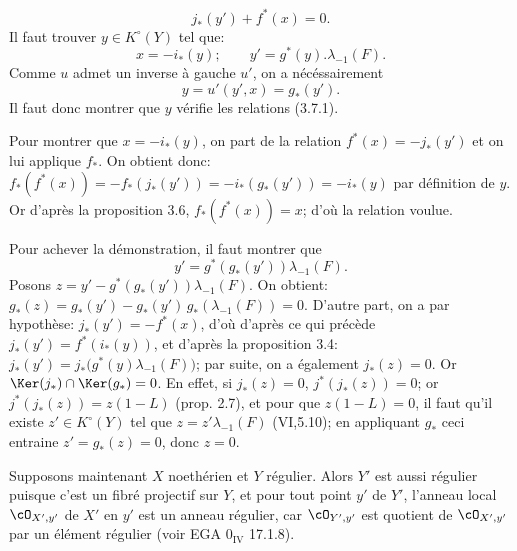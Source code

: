 \[
j_*(y')+f^*(x)=0.
\]
Il
faut trouver \(y\in K^\circ(Y)\) tel que:
\begin{equation}\tag{3.7.1}
x=-i_*(y);\qquad y'=g^*(y).\lambda_{-1}(F).
\end{equation}
Comme \(u\) admet un inverse à gauche \(u'\), on a nécéssairement
\[
y=u'(y',x)=g_*(y').
\]
Il faut donc montrer que \(y\) vérifie les relations (3.7.1).

Pour montrer que \(x=-i_*(y)\), on part de la relation \(f^*(x)=-j_*(y')\) et on lui applique \(f_*\). On obtient donc: \(f_*(f^*(x))=-f_*(j_*(y'))=-i_*(g_*(y'))=-i_*(y)\) par définition de \(y\). Or d'après la proposition 3.6, \(f_*(f^*(x))=x\); d'où la relation voulue.

Pour achever la démonstration, il faut montrer que
\[
y'=g^*(g_*(y'))\lambda_{-1}(F).
\]
Posons \(z=y'-g^*(g_*(y'))\lambda_{-1}(F)\). On obtient: \(g_*(z)=g_*(y')-g_*(y')\,g_*(\lambda_{-1}(F))=0\). D'autre part, on a par hypothèse: \(j_*(y')=-f^*(x)\), d'où d'après ce qui précède \(j_*(y')=f^*(i_*(y))\), et d'après la proposition 3.4: \(j_*(y')=j_*\bigl(g^*(y)\lambda_{-1}(F)\bigr)\); par suite, on a également \(j_*(z)=0\). Or \(\Ker(j_*)\cap\Ker(g_*)=0\). En effet, si \(j_*(z)=0\), \(j^*(j_*(z))=0\); or \(j^*(j_*(z))=z(1-L)\) (prop. 2.7), et pour que \(z(1-L)=0\), il faut qu'il existe \(z'\in K^\circ(Y)\) tel que \(z=z'\lambda_{-1}(F)\) (VI,5.10); en appliquant \(g_*\) ceci entraine \(z'=g_*(z)=0\), donc \(z=0\).

Supposons maintenant \(X\) noethérien et \(Y\) régulier. Alors \(Y'\) est aussi régulier puisque c'est un fibré projectif sur \(Y\), et pour tout point \(y'\) de \(Y'\), l'anneau local \(\cO_{X',y'}\) de \(X'\) en \(y'\) est un anneau régulier, car \(\cO_{Y',y'}\) est quotient de \(\cO_{X',y'}\) par un élément régulier (voir EGA \(0_{\mathrm{IV}}\) 17.1.8).


